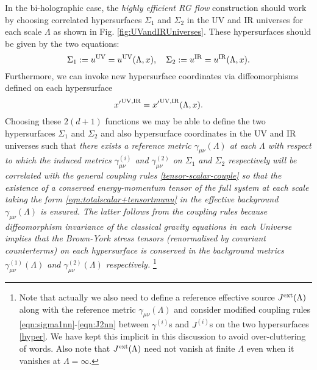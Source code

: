 \documentclass[prd,reprint,a4paper,showpacs,superscriptaddress,11pt,onecolumn,nofootinbib]{revtex4-1}
\newcommand{\be}{\begin{equation}}
\newcommand{\ee}{\end{equation}}
\renewcommand{\(}{\left(}
\renewcommand{\)}{\right)}
\newcommand{\6}{\partial}
\begin{document}
In the bi-holographic case, the \textit{highly efficient RG flow} construction should work by choosing correlated hypersurfaces $\Sigma_1$ and $\Sigma_2$ in the UV and IR universes for each scale $\Lambda$ as shown in Fig. \ref{fig:UVandIRUniverses}. These hypersurfaces should be given by the two equations:
\begin{equation}
\Sigma_1 := u^{\rm UV} = u^{\rm UV}(\Lambda, x), \quad \Sigma_2 := u^{\rm IR} = u^{\rm IR}(\Lambda, x).
\end{equation}
Furthermore, we can invoke new hypersurface coordinates via diffeomorphisms defined on each hypersurface
\be\label{hyper}
{x'}^{\rm UV, IR} = {x'}^{\rm UV, IR}(\Lambda, x).
\ee
Choosing these $2(d+1)$ functions we may be able to define the two hypersurfaces $\Sigma_1$ and $\Sigma_2$ and also hypersurface coordinates in the UV and IR universes such that \textit{there exists a reference metric $\gamma_{\mu\nu}(\Lambda)$ at each $\Lambda$ with respect to which the induced metrics $\gamma^{(i)}_{\mu\nu}$ and $\gamma^{(2)}_{\mu\nu}$ on $\Sigma_1$ and $\Sigma_2$ respectively will be correlated with the general coupling rules \eqref{tensor-scalar-couple} so that the existence of a conserved energy-momentum tensor of the full system at each scale taking the form \eqref{eqn:totalscalar+tensortmunu} in the effective background $\gamma_{\mu\nu}(\Lambda)$ is ensured. The latter follows from the coupling rules because diffeomorphism invariance of the classical gravity equations in each Universe implies that the Brown-York stress tensors (renormalised by covariant counterterms) on each hypersurface is conserved in the background metrics  $\gamma^{(1)}_{\mu\nu}(\Lambda)$ and $\gamma^{(2)}_{\mu\nu}(\Lambda)$ respectively. }\footnote{Note that actually we also need to define a reference effective source $J^{\rm ext}(\Lambda)$ along with the reference metric $\gamma_{\mu\nu}(\Lambda)$ and consider modified coupling rules  \eqref{eqn:sigma1nn}-\eqref{eqn:J2nn} between $\gamma^{(i)}$s and $J^{(i)}$s on the two hypersurfaces \eqref{hyper}. We have kept this implicit in this discussion to avoid over-cluttering of words. Also note that $J^{\rm ext}(\Lambda)$ need not vanish at finite $\Lambda$ even when it vanishes at $\Lambda = \infty$. } 
\end{document}
